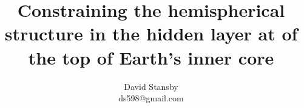 \documentclass[11pt,a4paper]{article}
\begin{document}
\title{Constraining the hemispherical structure in the hidden layer at of the top of Earth's inner core}
\author{David Stansby \\ ds598@gmail.com }
\maketitle
\end{document}
